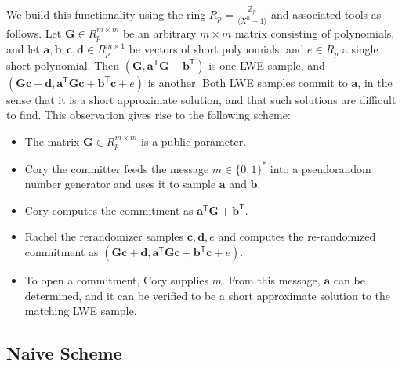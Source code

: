 We build this functionality using the ring $R_p = \frac{\mathbb{Z}_p}{\langle X^n + 1\rangle}$ and associated tools as follows. Let $\mathbf{G} \in R_p^{m \times m}$ be an arbitrary $m \times m$ matrix consisting of polynomials, and let $\mathbf{a}, \mathbf{b}, \mathbf{c}, \mathbf{d} \in R_p^{m \times 1}$ be vectors of short polynomials, and $e \in R_p$ a single short polynomial. Then $(\mathbf{G}, \mathbf{a}^\mathsf{T} \mathbf{G} + \mathbf{b}^\mathsf{T})$ is one LWE sample, and $(\mathbf{G}\mathbf{c} + \mathbf{d}, \mathbf{a}^\mathsf{T} \mathbf{G} \mathbf{c} + \mathbf{b}^\mathsf{T} \mathbf{c} + e)$ is another. Both LWE samples commit to $\mathbf{a}$, in the sense that it is a short approximate solution, and that such solutions are difficult to find. This observation gives rise to the following scheme:
\begin{itemize}
\item The matrix $\mathbf{G} \in R_p^{m \times m}$ is a public parameter.
\item Cory the committer feeds the message $m \in \{0,1\}^*$ into a pseudorandom number generator and uses it to sample $\mathbf{a}$ and $\mathbf{b}$.
\item Cory computes the commitment as $\mathbf{a}^\mathsf{T} \mathbf{G} + \mathbf{b}^\mathsf{T}$.
\item Rachel the rerandomizer samples $\mathbf{c}, \mathbf{d}, e$ and computes the re-randomized commitment as $(\mathbf{G}\mathbf{c} + \mathbf{d}, \mathbf{a}^\mathsf{T} \mathbf{G} \mathbf{c} + \mathbf{b}^\mathsf{T} \mathbf{c} + e)$.
\item To open a commitment, Cory supplies $m$. From this message, $\mathbf{a}$ can be determined, and it can be verified to be a short approximate solution to the matching LWE sample.
\end{itemize}

\subsection{Naive Scheme}

